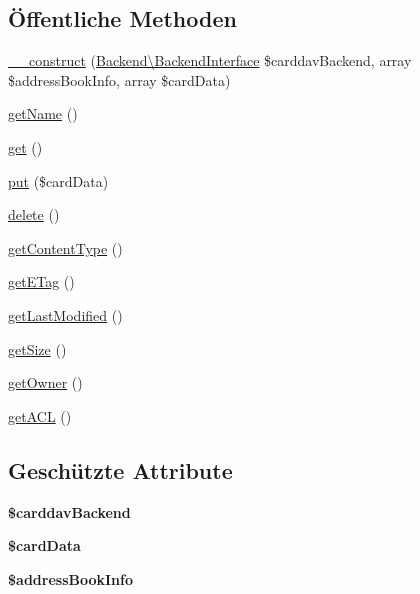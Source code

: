 \subsection*{Öffentliche Methoden}
\begin{DoxyCompactItemize}
\item 
\mbox{\hyperlink{class_sabre_1_1_card_d_a_v_1_1_card_af0df15beeabd07f7b22764b750c1fce4}{\+\_\+\+\_\+construct}} (\mbox{\hyperlink{interface_sabre_1_1_card_d_a_v_1_1_backend_1_1_backend_interface}{Backend\textbackslash{}\+Backend\+Interface}} \$carddav\+Backend, array \$address\+Book\+Info, array \$card\+Data)
\item 
\mbox{\hyperlink{class_sabre_1_1_card_d_a_v_1_1_card_aa9304e2cfc2d3e362c781b87af8f7436}{get\+Name}} ()
\item 
\mbox{\hyperlink{class_sabre_1_1_card_d_a_v_1_1_card_ab134afaa3e735b4af870f7dead651184}{get}} ()
\item 
\mbox{\hyperlink{class_sabre_1_1_card_d_a_v_1_1_card_aa302479ba1c1d8d216331aa61ad8d8df}{put}} (\$card\+Data)
\item 
\mbox{\hyperlink{class_sabre_1_1_card_d_a_v_1_1_card_a91e000b75097d1d8083cc4b1426c5467}{delete}} ()
\item 
\mbox{\hyperlink{class_sabre_1_1_card_d_a_v_1_1_card_a236500a390730115bf035c20ff78b3d9}{get\+Content\+Type}} ()
\item 
\mbox{\hyperlink{class_sabre_1_1_card_d_a_v_1_1_card_a056407dada85e2786c53b6a26ead94e7}{get\+E\+Tag}} ()
\item 
\mbox{\hyperlink{class_sabre_1_1_card_d_a_v_1_1_card_ac23e42400b1adf96d325ddc5f25b1717}{get\+Last\+Modified}} ()
\item 
\mbox{\hyperlink{class_sabre_1_1_card_d_a_v_1_1_card_aea671f67af75006c2845565d8a55599e}{get\+Size}} ()
\item 
\mbox{\hyperlink{class_sabre_1_1_card_d_a_v_1_1_card_aed3e88c557d1bf6b1dfd75b02bad3fbc}{get\+Owner}} ()
\item 
\mbox{\hyperlink{class_sabre_1_1_card_d_a_v_1_1_card_a90af69dccfdb104a918c09aaad628594}{get\+A\+CL}} ()
\end{DoxyCompactItemize}
\subsection*{Geschützte Attribute}
\begin{DoxyCompactItemize}
\item 
\mbox{\label{class_sabre_1_1_card_d_a_v_1_1_card_accd3f60d8cf1cca9efcea0e1712cee5a}} 
{\bfseries \$carddav\+Backend}
\item 
\mbox{\label{class_sabre_1_1_card_d_a_v_1_1_card_a4f4b4bfa51c8756d9dd91634ce12eb3b}} 
{\bfseries \$card\+Data}
\item 
\mbox{\label{class_sabre_1_1_card_d_a_v_1_1_card_a4c4dd143ce6424684b9bfd72ec754cd6}} 
{\bfseries \$address\+Book\+Info}
\end{DoxyCompactItemize}


